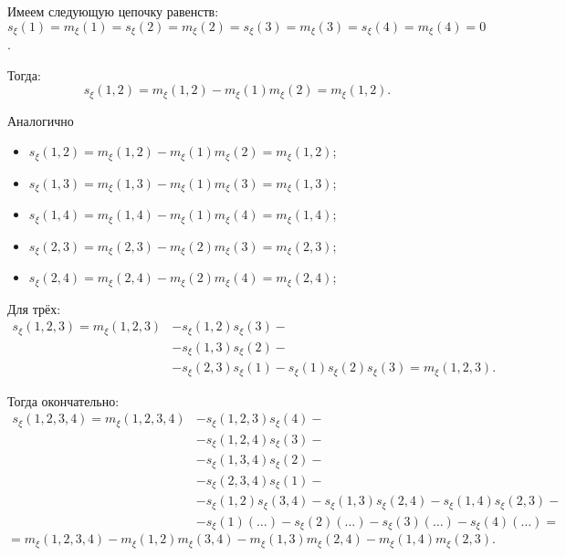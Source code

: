 		\begin{Proof}
			Имеем следующую цепочку равенств: $s_\xi(1) = m_\xi(1) = s_\xi(2) = m_\xi(2) = s_\xi(3) = m_\xi(3) = s_\xi(4) = m_\xi(4) = 0$.
			
			Тогда:
			\begin{equation*}
				s_\xi(1, 2) = m_\xi(1, 2) - m_\xi(1) m_\xi (2) = m_\xi(1, 2).
			\end{equation*}
		
			Аналогично
			\begin{itemize}
				\item $s_\xi(1, 2) = m_\xi(1, 2) - m_\xi(1) m_\xi (2) = m_\xi(1, 2)$;
				
				\item $s_\xi(1, 3) = m_\xi(1, 3) - m_\xi(1) m_\xi (3) = m_\xi(1, 3)$;
				
				\item $s_\xi(1, 4) = m_\xi(1, 4) - m_\xi(1) m_\xi (4) = m_\xi(1, 4)$;
				
				\item $s_\xi(2, 3) = m_\xi(2, 3) - m_\xi(2) m_\xi (3) = m_\xi(2, 3)$;
				
				\item $s_\xi(2, 4) = m_\xi(2, 4) - m_\xi(2) m_\xi (4) = m_\xi(2, 4)$;
			\end{itemize}
		
			Для трёх:
			\begin{equation*}
				\begin{split}
				s_\xi(1, 2, 3) = m_\xi(1, 2, 3) &- s_\xi(1, 2)s_\xi(3) - \\ 
				&- s_\xi(1, 3)s_\xi(2) - \\ 
				&- s_\xi(2, 3)s_\xi(1) - s_\xi(1)s_\xi(2)s_\xi(3) = m_\xi(1, 2, 3).
				\end{split}
			\end{equation*}
		
			Тогда окончательно:
			\begin{equation*}
				\begin{split}
					s_\xi(1, 2, 3, 4) = m_\xi(1, 2, 3, 4) &- s_\xi(1, 2, 3)s_\xi(4) - \\
					&- s_\xi(1, 2, 4)s_\xi(3) - \\
					&- s_\xi(1, 3, 4)s_\xi(2) - \\
					&- s_\xi(2, 3, 4)s_\xi(1) - \\ &- s_\xi(1, 2)s_\xi(3, 4) - s_\xi(1, 3)s_\xi(2, 4) - s_\xi(1, 4)s_\xi(2, 3) - \\
					&- s_\xi(1)(\ldots) - s_\xi(2)(\ldots) - s_\xi(3)(\ldots) - s_\xi(4)(\ldots) =
				\end{split}
			\end{equation*}
			\begin{equation*}
				=  m_\xi(1, 2, 3, 4) - m_\xi(1, 2)m_\xi(3, 4) - m_\xi(1, 3)m_\xi(2, 4) - m_\xi(1, 4)m_\xi(2, 3).
			\end{equation*}
		\end{Proof}



